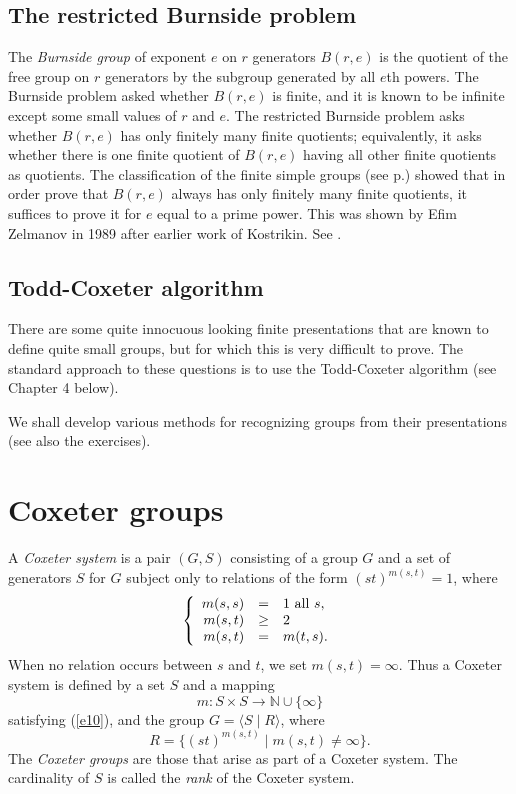 \documentclass[a4paper,11pt,final]{memoir}%
\theoremstyle{nonumberplain}
\begin{document}
\subsection{The restricted Burnside problem%
%
}

The \emph{Burnside group}%
of exponent $e$ on $r$ generators $B(r,e)$ is the quotient of the free group
on $r$ generators by the subgroup generated by all $e$th powers. The Burnside
problem asked whether $B(r,e)$ is finite, and it is known to be infinite
except some small values of $r$ and $e$. The restricted Burnside problem asks
whether $B(r,e)$ has only finitely many finite quotients; equivalently, it
asks whether there is one finite quotient of $B(r,e)$ having all other finite
quotients as quotients. The classification of the finite simple groups (see
p.\thinspace\pageref{classification}) showed that in order prove that $B(r,e)$
always has only finitely many finite quotients, it suffices to prove it for
$e$ equal to a prime power. This was shown by Efim Zelmanov in 1989 after
earlier work of Kostrikin. See \cite{feit1995}.

\subsection{Todd-Coxeter algorithm%
%
}

There are some quite innocuous looking finite presentations that are known to
define quite small groups, but for which this is very difficult to prove. The
standard approach to these questions is to use the Todd-Coxeter algorithm (see
Chapter 4 below).

We shall develop various methods for recognizing groups from their
presentations (see also the exercises).

\section{Coxeter groups}

A \emph{Coxeter system}%
is a pair $(G,S)$ consisting of a group $G$ and a set of generators $S$ for
$G$ subject only to relations of the form $(st)^{m(s,t)}=1$, where
\begin{equation}
\left\{
\begin{array}
[c]{rcl}%
m(s,s) & = & 1\text{ all }s,\\
m(s,t) & \geq & 2\\
m(s,t) & = & m(t,s).
\end{array}
\right.  \label{e10}%
\end{equation}
When no relation occurs between $s$ and $t$, we set $m(s,t)=\infty$. Thus a
Coxeter system is defined by a set $S$ and a mapping%
\[
m\colon S\times S\rightarrow\mathbb{N}{}\cup\{\infty\}
\]
satisfying (\ref{e10}), and the group $G=\langle S\mid R\rangle$, where%
\[
R=\{(st)^{m(s,t)}\mid m(s,t)\neq\infty\}\text{.}%
\]
The \emph{Coxeter groups}%
%
\emph{ }are those that arise as part of a Coxeter system. The cardinality of
$S$ is called the \emph{rank}%
of the Coxeter system.
\end{document}
